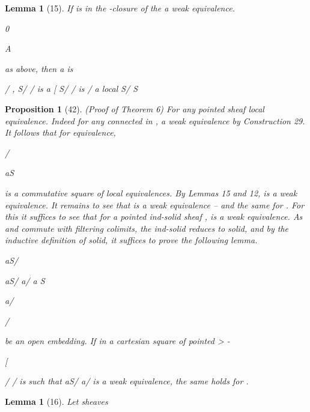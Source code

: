 \documentclass[11pt,a4paper]{article}
\theoremstyle{plain}
\newtheorem{lemma}[theorem]{Lemma}
\newtheorem{proposition}[theorem]{Proposition}
\theoremstyle{definition}
\begin{document}
\begin{lemma}[15]
If is in the  -closure of the
a weak equivalence.



0

 A

 as above, then a  is

/ , S/  / is a
 [ S/  / is
 /
a local
S/   S 

\end{lemma}

\begin{proposition}[42]
(Proof of Theorem 6) For any pointed sheaf
local equivalence. Indeed for any connected
in
,
a weak equivalence by Construction 29. It follows that for
equivalence,




/ 




aS 

is a commutative square of local equivalences. By Lemmas 15 and 12,
is a
weak equivalence. It remains to see that
is a weak equivalence --
and the same for . For this it suffices to see that for a pointed ind-solid sheaf ,
is a weak equivalence. As
and
commute with filtering
colimits, the ind-solid reduces to solid, and by the inductive definition of solid, it
suffices to prove the following lemma.

aS/ 

aS/  a/ 
a S

a/ 

/

 be an open embedding. If in a cartesian square of pointed
 >    - 


[


/ 
/ is such that aS/  a/  is a weak equivalence, the same holds for .
\end{proposition}

\begin{lemma}[16]
Let
sheaves



\end{lemma}
\end{document}
